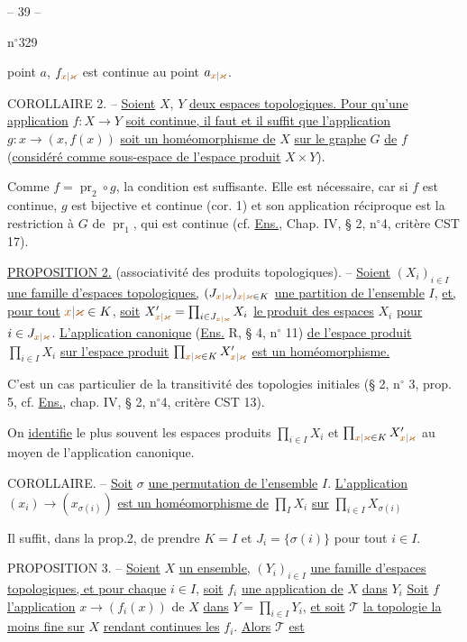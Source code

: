 \begin{center}-- 39 --\end{center}
\hfill n$^{\circ}$329

point $a$, $f_{\unsure{x|\varkappa}}$ est continue au point $a_{\unsure{x|\varkappa}}$.

COROLLAIRE 2. -- \uline{Soient} $X$, $Y$ \uline{deux espaces topologiques. Pour qu'une application} $f:X\to Y$ \uline{soit continue, il faut et il suffit que l'application} $g:x\to(x,f(x))$ \uline{soit un homéomorphisme de} $X$ \uline{sur le graphe} $G$ \uline{de} $f$ (\uline{considéré comme sous-espace de l'espace produit} $X\times Y$).

Comme $f=\operatorname{pr}_2\circ g$, la condition est suffisante. Elle est nécessaire, car si $f$ est continue, $g$ est bijective et continue (cor. 1) et son application réciproque est la restriction à $G$ de $\operatorname{pr}_1$, qui est continue (cf. \uline{Ens.}, Chap. IV, § 2, n$^{\circ}$4, critère CST 17).

\uline{PROPOSITION 2.} (associativité des produits topologiques). -- \uline{Soient} $(X_i)_{i\in I}$ \uline{une famille d'espaces topologiques,} $(J_{\unsure{x|\varkappa}})_{\unsure{x|\varkappa}\in K}$ \uline{une partition de l'ensemble} $I$, \uline{et, pour tout} $\unsure{x|\varkappa}\in K$, \uline{soit} $X'_{\unsure{x|\varkappa}}=\prod_{i\in J_{\unsure{x|\varkappa}}}X_i$ \uline{le produit des espaces} $X_i$ \uline{pour} $i\in J_{\unsure{x|\varkappa}}$. \uline{L'application canonique} (\uline{Ens.} R, § 4, n$^{\circ}$ 11) \uline{de l'espace produit} $\prod_{i\in I}X_i$ \uline{sur l'espace produit} $\prod_{\unsure{x|\varkappa}\in K}X'_{\unsure{x|\varkappa}}$ \uline{est un homéomorphisme.}

C'est un cas particulier de la transitivité des topologies initiales (§ 2, n$^{\circ}$ 3, prop. 5, cf. \uline{Ens.}, chap. IV, § 2, n$^{\circ}$4, critère CST 13).

On \uline{identifie} le plus souvent les espaces produits $\prod_{i\in I}X_i$ et $\prod_{\unsure{x|\varkappa}\in K}X'_{\unsure{x|\varkappa}}$ au moyen de l'application canonique.

COROLLAIRE. -- \uline{Soit} $\sigma$ \uline{une permutation de l'ensemble} $I$. \uline{L'application} $(x_i)\to(x_{\sigma(i)})$ \uline{est un homéomorphisme de} $\prod_I X_i$ \uline{sur} $\prod_{i\in I}X_{\sigma(i)}$

Il suffit, dans la prop.2, de prendre $K=I$ et $J_i=\{\sigma(i)\}$ pour tout $i\in I$.

PROPOSITION 3. -- \uline{Soient} $X$ \uline{un ensemble,} $(Y_i)_{i\in I}$ \uline{une famille d'espaces topologiques, et pour chaque} $i\in I$, \uline{soit} $f_i$ \uline{une application de} $X$ \uline{dans} $Y_i$ \uline{Soit} $f$ \uline{l'application} $x\to(f_i(x))$ de $X$ \uline{dans} $Y=\prod_{i\in I}Y_i$, \uline{et soit} $\mathcal{T}$ \uline{la topologie la moins fine sur} $X$ \uline{rendant continues les} $f_i$. \uline{Alors} $\mathcal{T}$ \uline{est}
